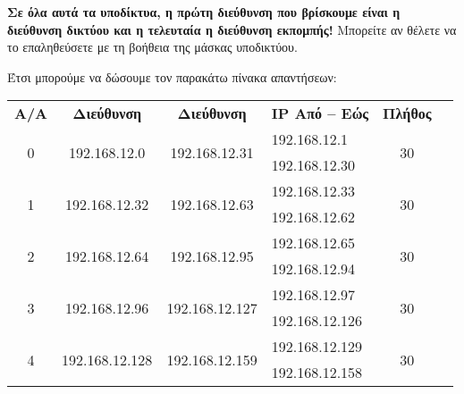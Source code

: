\textbf{Σε όλα αυτά τα υποδίκτυα, η πρώτη διεύθυνση που βρίσκουμε είναι η διεύθυνση δικτύου και η τελευταία η διεύθυνση εκπομπής!} Μπορείτε αν θέλετε να το επαληθεύσετε με τη βοήθεια της μάσκας υποδικτύου.

Έτσι μπορούμε να δώσουμε τον παρακάτω πίνακα απαντήσεων:

\begin{center}
\fontsize{10}{12}
\ttfamily
\begin{tabular}{|c|c|c|c|c|c|c|}
\hline
 \multirow{2}{*}{\textbf{A/A}} & \multirow{2}{*}{\textbf{Διεύθυνση}} & \multirow{2}{*}{\textbf{Διεύθυνση}} &  \multicolumn{2}{l|}{\multirow{2}{*}{\textbf{IP Από -- Εώς}}} & \multirow{2}{*}{\textbf{Πλήθος}} \\ 
& \textbf{Δικτύου} & \textbf{Εκπομπής} & \multicolumn{2}{l|}{} & \textbf{Υπολογιστών}\\
\hline
\multirow{2}{*}{0} & \multirow{2}{*}{192.168.12.0} & \multirow{2}{*}{192.168.12.31} & \multicolumn{2}{l|}{192.168.12.1} & \multirow{2}{*}{30} \\ \cline{4-5}
                  &                   &                   & \multicolumn{2}{l|}{192.168.12.30} &                   \\ \hline
\multirow{2}{*}{1} & \multirow{2}{*}{192.168.12.32} & \multirow{2}{*}{192.168.12.63} & \multicolumn{2}{l|}{192.168.12.33} & \multirow{2}{*}{30} \\ \cline{4-5}
                  &                   &                   & \multicolumn{2}{l|}{192.168.12.62} &                   \\ \hline
\multirow{2}{*}{2} & \multirow{2}{*}{192.168.12.64} & \multirow{2}{*}{192.168.12.95} & \multicolumn{2}{l|}{192.168.12.65} & \multirow{2}{*}{30} \\ \cline{4-5}
                  &                   &                   & \multicolumn{2}{l|}{192.168.12.94} &                   \\ \hline
\multirow{2}{*}{3} & \multirow{2}{*}{192.168.12.96} & \multirow{2}{*}{192.168.12.127} & \multicolumn{2}{l|}{192.168.12.97} & \multirow{2}{*}{30} \\ \cline{4-5}
                  &                   &                   & \multicolumn{2}{l|}{192.168.12.126} &                   \\ \hline
\multirow{2}{*}{4} & \multirow{2}{*}{192.168.12.128} & \multirow{2}{*}{192.168.12.159} & \multicolumn{2}{l|}{192.168.12.129} & \multirow{2}{*}{30} \\ \cline{4-5}
                  &                   &                   & \multicolumn{2}{l|}{192.168.12.158} &                   \\ \hline

\end{tabular}
\end{center}
